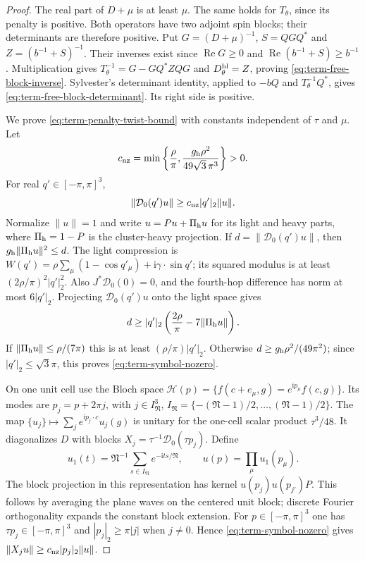\begin{proof}
The real part of $D+\mu$ is at least $\mu$.
The same holds for $T_\theta$, since its penalty is positive.
Both operators have two adjoint spin blocks; their determinants
are therefore positive. Put $G=(D+\mu)^{-1}$,
$S=QGQ^*$ and $Z=(b^{-1}+S)^{-1}$.
Their inverses exist since $\operatorname{Re}G\ge0$ and
$\operatorname{Re}(b^{-1}+S)\ge b^{-1}$.
Multiplication gives
$T_\theta^{-1}=G-GQ^*ZQG$ and
$D_\theta^{\rm bl}=Z$, proving
\eqref{eq:term-free-block-inverse}.
Sylvester's determinant identity, applied to
$-\!bQ$ and $T_\theta^{-1}Q^*$, gives
\eqref{eq:term-free-block-determinant}. Its right side is
positive.

We prove \eqref{eq:term-penalty-twist-bound} with constants
independent of $\tau$ and $\mu$.
Let
\[
 c_{\rm nz}=\min\left\{\frac\rho\pi,
             \frac{g_{\rm h}\rho^2}{49\sqrt3\,\pi^3}\right\}>0.
\]
For real $q'\in[-\pi,\pi]^3$,
\begin{equation}\label{eq:term-symbol-nozero}
             \|\mathcal D_0(q')u\|
                         \ge c_{\rm nz}|q'|_2\|u\|.
\end{equation}
Normalize $\|u\|=1$ and
write $u=Pu+\Pi_{\rm h}u$ for its light and heavy parts,
where $\Pi_{\rm h}=1-P$ is the cluster-heavy projection.
If $d=\|\mathcal D_0(q')u\|$, then
$g_{\rm h}\|\Pi_{\rm h}u\|^2\le d$.
The light compression is
$W(q')=\rho\sum_\mu(1-\cos q'_\mu)+
\mathrm i\gamma\cdot\sin q'$; its squared modulus is
at least $(2\rho/\pi)^2|q'|_2^2$.
Also $J^*\mathcal D_0(0)=0$, and the fourth-hop
difference has norm at most $6|q'|_2$.
Projecting $\mathcal D_0(q')u$ onto the light space gives
\[
 d\ge |q'|_2\left(\frac{2\rho}{\pi}-7\|\Pi_{\rm h}u\|\right).
\]
If $\|\Pi_{\rm h}u\|\le\rho/(7\pi)$ this is at least
$(\rho/\pi)|q'|_2$. Otherwise
$d\ge g_{\rm h}\rho^2/(49\pi^2)$; since
$|q'|_2\le\sqrt3\pi$, this proves
\eqref{eq:term-symbol-nozero}.

On one unit cell use the Bloch space
$\mathcal H(p)=\{f(c+e_\mu,g)=e^{\mathrm ip_\mu}f(c,g)\}$.
Its modes are $p_j=p+2\pi j$, with
$j\in I_{\mathfrak N}^3$,
$I_{\mathfrak N}=\{-(\mathfrak N-1)/2,\ldots,
(\mathfrak N-1)/2\}$.
The map
$\{u_j\}\mapsto\sum_j e^{\mathrm ip_j\cdot c}u_j(g)$
is unitary for the one-cell scalar product $\tau^3/48$.
It diagonalizes $D$ with blocks
$X_j=\tau^{-1}\mathcal D_0(\tau p_j)$.
Define
\[
 u_1(t)=\mathfrak N^{-1}\sum_{s\in I_{\mathfrak N}}
                                      e^{-\mathrm its/\mathfrak N},
 \qquad u(p)=\prod_\mu u_1(p_\mu).
\]
The block projection in this representation has kernel
$u(p_j)u(p_{j'})P$. This follows by averaging the plane
waves on the centered unit block; discrete Fourier
orthogonality expands the constant block extension.
For $p\in[-\pi,\pi]^3$ one has $\tau p_j\in[-\pi,\pi]^3$
and $|p_j|_2\ge\pi|j|$ when $j\ne0$.
Hence \eqref{eq:term-symbol-nozero} gives
$\|X_ju\|\ge c_{\rm nz}|p_j|_2\|u\|$.


\end{proof}
